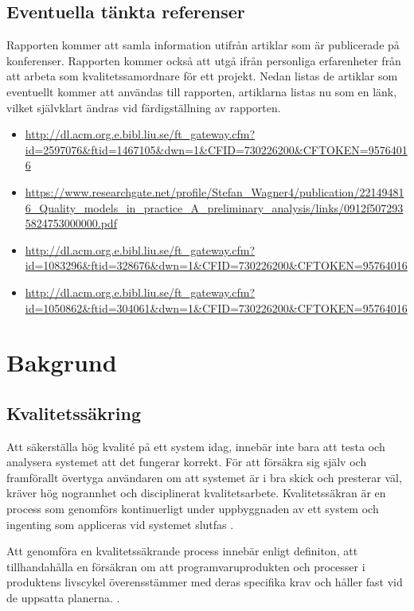 \clearpage

\subsection{Eventuella tänkta referenser}

Rapporten kommer att samla information utifrån artiklar som är publicerade på konferenser. Rapporten kommer också att utgå ifrån personliga erfarenheter från att arbeta som kvalitetssamordnare för ett projekt. Nedan listas de artiklar som eventuellt kommer att användas till rapporten, artiklarna listas nu som en länk, vilket självklart ändras vid färdigställning av rapporten.

\begin{itemize}
	\item \url{http://dl.acm.org.e.bibl.liu.se/ft_gateway.cfm?id=2597076&ftid=1467105&dwn=1&CFID=730226200&CFTOKEN=95764016}
	\item \url{https://www.researchgate.net/profile/Stefan_Wagner4/publication/221494816_Quality_models_in_practice_A_preliminary_analysis/links/0912f5072935824753000000.pdf}
	\item \url{http://dl.acm.org.e.bibl.liu.se/ft_gateway.cfm?id=1083296&ftid=328676&dwn=1&CFID=730226200&CFTOKEN=95764016}
	\item 
	\url{	http://dl.acm.org.e.bibl.liu.se/ft_gateway.cfm?id=1050862&ftid=304061&dwn=1&CFID=730226200&CFTOKEN=95764016}

\end{itemize}

\section{Bakgrund}
\label{sec:background-wallstrom}
\subsection{Kvalitetssäkring}
Att säkerställa hög kvalité på ett system idag, innebär inte bara att testa och analysera systemet att det fungerar korrekt. För att försäkra sig själv och framförallt övertyga användaren om att systemet är i bra skick och presterar väl, kräver hög nogrannhet och disciplinerat kvalitetsarbete. Kvalitetssäkran är en process som genomförs kontinuerligt under uppbyggnaden av ett system och ingenting som appliceras vid systemet slutfas \cite{feldman2005quality}.

Att genomföra en kvalitetssäkrande process innebär enligt definiton, att tillhandahålla en försäkran om att programvaruprodukten och processer i produktens livscykel överensstämmer med deras specifika krav och håller fast vid de uppsatta planerna. \cite{feldman2005quality}.


